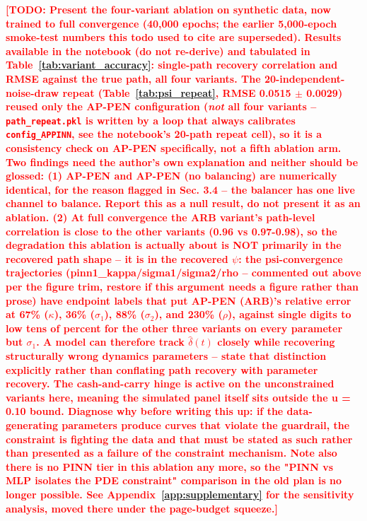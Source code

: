 \documentclass[11pt, a4paper]{article}
\newcommand{\todo}[1]{\textcolor{red}{\textbf{[TODO: #1]}}}
\begin{document}
\todo{Present the four-variant ablation on synthetic data, now trained to full
  convergence (40{,}000 epochs; the earlier 5{,}000-epoch smoke-test numbers this
  todo used to cite are superseded). Results available in the notebook (do not
  re-derive) and tabulated in Table~\ref{tab:variant_accuracy}: single-path
  recovery correlation and RMSE against the true path, all four variants.
  The 20-independent-noise-draw repeat (Table~\ref{tab:psi_repeat}, RMSE
  0.0515 $\pm$ 0.0029) reused only the AP-PEN configuration (\emph{not} all
  four variants -- \texttt{path\_repeat.pkl} is written by a loop that always
  calibrates \texttt{config\_APPINN}, see the notebook's 20-path repeat cell),
  so it is a consistency check on AP-PEN specifically, not a fifth ablation arm.
  Two findings need the author's own explanation and neither should be glossed:
  (1) AP-PEN and AP-PEN (no balancing) are numerically identical, for the
      reason flagged in Sec. 3.4 -- the balancer has one live channel to balance.
      Report this as a null result, do not present it as an ablation.
  (2) At full convergence the ARB variant's path-level correlation is close to
      the other variants (0.96 vs 0.97-0.98), so the degradation this ablation
      is actually about is NOT primarily in the recovered path shape -- it is in
      the recovered $\psi$: the psi-convergence trajectories (pinn1\_kappa/sigma1/sigma2/rho -- commented out above per the figure trim, restore if this argument needs a figure rather than prose) have endpoint labels that put
      AP-PEN (ARB)'s relative error at 67\% ($\kappa$), 36\% ($\sigma_1$), 88\%
      ($\sigma_2$), and 230\% ($\rho$), against single digits to low tens of
      percent for the other three variants on every parameter but $\sigma_1$.
      A model can therefore track $\hat\delta(t)$ closely while recovering
      structurally wrong dynamics parameters -- state that distinction
      explicitly rather than conflating path recovery with parameter recovery.
      The cash-and-carry hinge is active on the unconstrained variants here,
      meaning the simulated panel itself sits outside the u = 0.10 bound.
      Diagnose why before writing this up: if the data-generating parameters
      produce curves that violate the guardrail, the constraint is fighting the
      data and that must be stated as such rather than presented as a failure of
      the constraint mechanism.
  Note also there is no PINN tier in this ablation any more, so the "PINN vs MLP
  isolates the PDE constraint" comparison in the old plan is no longer possible.
  See Appendix~\ref{app:supplementary} for the sensitivity analysis, moved there
  under the page-budget squeeze.}
\end{document}
